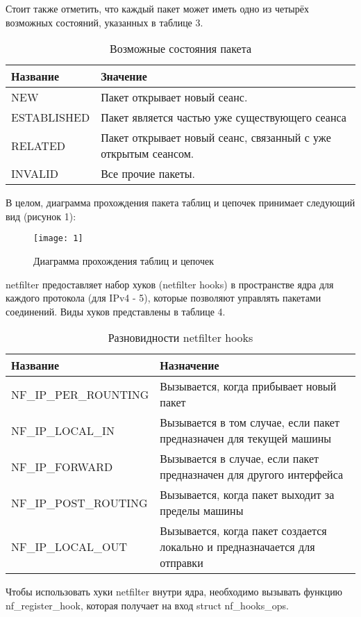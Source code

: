 Стоит также отметить, что каждый пакет может иметь одно из четырёх возможных состояний, указанных в таблице 3.
\newpage
\begin{table}[h!]
	\caption{Возможные состояния пакета}
	\begin{tabular}{|p{4cm}|p{12.7cm}|}
		\hline
		Название & Значение \\
		\hline
		NEW & Пакет открывает новый сеанс. \\
		\hline
		ESTABLISHED & Пакет является частью уже существующего сеанса \\
		\hline
		RELATED & Пакет открывает новый сеанс, связанный с уже открытым сеансом.  \\
		\hline
		INVALID & Все прочие пакеты. \\
		\hline
	\end{tabular}
\end{table}
\newpage
В целом, диаграмма прохождения пакета таблиц и цепочек принимает следующий вид (рисунок 1):
\begin{figure}[h!]\center 
	\caption{Диаграмма прохождения таблиц и цепочек}
	\texttt{[image: 1]}
\end{figure}
netfilter предоставляет набор хуков (netfilter hooks) в пространстве ядра для каждого протокола (для IPv4 - 5), которые позволяют управлять пакетами соединений. Виды хуков представлены в таблице 4.

\begin{table}[h!]
	\caption{Разновидности netfilter hooks}
	\begin{tabular}{|p{6cm}|p{10.7cm}|}
	\hline
	Название & Назначение \\
	\hline
	NF\_IP\_PER\_ROUNTING & Вызывается, когда прибывает новый пакет  \\
	\hline
	NF\_IP\_LOCAL\_IN  & Вызывается в том случае, если пакет предназначен для текущей машины \\
	\hline
	NF\_IP\_FORWARD & Вызывается в случае, если пакет предназначен для другого интерфейса \\
	\hline
	NF\_IP\_POST\_ROUTING & Вызывается, когда пакет выходит за пределы машины \\
	\hline
	NF\_IP\_LOCAL\_OUT & Вызывается, когда пакет создается локально и предназначается для отправки \\
	\hline
\end{tabular}
\end{table}

Чтобы использовать хуки netfilter внутри ядра, необходимо вызывать функцию nf\_register\_hook, которая получает на вход
struct nf\_hooks\_ops.

